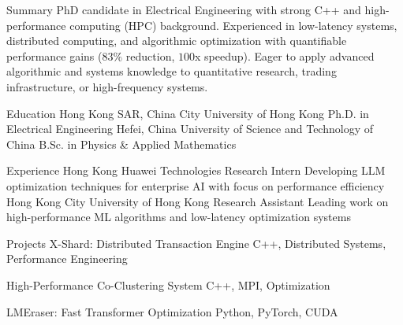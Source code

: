 \documentclass[caps, english]{financecv}
\begin{document}
\begin{cvsection}{Summary}
PhD candidate in Electrical Engineering with strong C++ and high-performance computing (HPC) background. Experienced in low-latency systems, distributed computing, and algorithmic optimization with quantifiable performance gains ($83\%$ reduction, $100$x speedup). Eager to apply advanced algorithmic and systems knowledge to quantitative research, trading infrastructure, or high-frequency systems.
\end{cvsection}

\begin{cvsection}{Education}
{Hong Kong SAR, China}
{City University of Hong Kong}
{Ph.D. in Electrical Engineering}
{}
{}
{}
{}
{Hefei, China}
{University of Science and Technology of China}
{B.Sc. in Physics \& Applied Mathematics}
{}
{}
{}
{}
\end{cvsection}

\begin{cvsection}{Experience}
{Hong Kong}
{Huawei Technologies}
{Research Intern}
{Developing LLM optimization techniques for enterprise AI with focus on performance efficiency}
{}
{}
{}
{Hong Kong}
{City University of Hong Kong}
{Research Assistant}
{Leading work on high-performance ML algorithms and low-latency optimization systems}
{}
{}
{}
\end{cvsection}

\begin{cvsection}{Projects}
{X-Shard: Distributed Transaction Engine}
{C++, Distributed Systems, Performance Engineering}
{}
{
}
{}

{High-Performance Co-Clustering System}
{C++, MPI, Optimization}
{}
{
}
{}

{LMEraser: Fast Transformer Optimization}
{Python, PyTorch, CUDA}
{}
{
}
{}
\end{cvsection}
\end{document}
